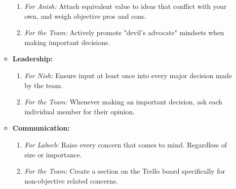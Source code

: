 \documentclass[12pt, titlepage]{article}
\begin{document}
\begin{enumerate}
\begin{itemize}
\begin{enumerate}
                  \item \textit{For Anish:} Attach equivalent value to ideas that conflict with your own, and weigh objective pros and cons.
                  \item \textit{For the Team:} Actively promote "devil's advocate" mindsets when making important decisions.
                \end{enumerate}
          \item \textbf{Leadership:}
                \begin{enumerate}
                  \item \textit{For Nish:} Ensure input at least once into every major decision made by the team.
                  \item \textit{For the Team:} Whenever making an important decision, ask each individual member for their opinion.
                \end{enumerate}
          \item \textbf{Communication:}
                \begin{enumerate}
                  \item \textit{For Labeeb:} Raise every concern that comes to mind. Regardless of size or importance.
                  \item \textit{For the Team:} Create a section on the Trello board specifically for non-objective related concerns.
                \end{enumerate}
        \end{itemize}
\end{enumerate}
\end{document}
